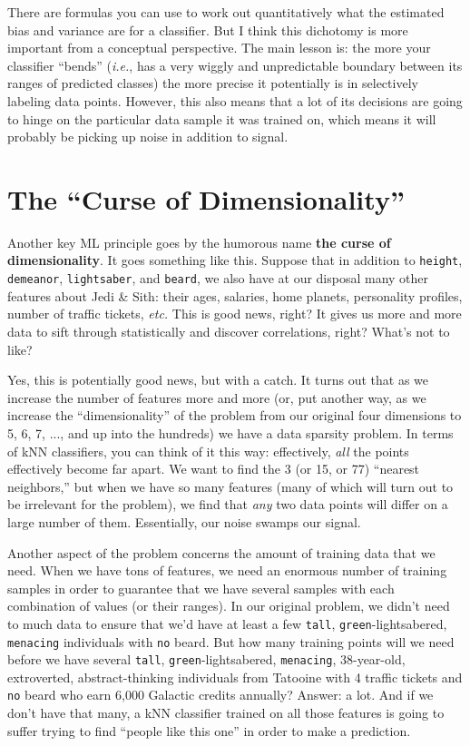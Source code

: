 There are formulas you can use to work out quantitatively what the estimated
bias and variance are for a classifier. But I think this dichotomy is more
important from a conceptual perspective. The main lesson is: the more your
classifier ``bends'' (\textit{i.e.}, has a very wiggly and unpredictable
boundary between its ranges of predicted classes) the more precise it
potentially is in selectively labeling data points. However, this also means
that a lot of its decisions are going to hinge on the particular data sample
it was trained on, which means it will probably be picking up noise in
addition to signal.


\section{The ``Curse of Dimensionality''}

Another key ML principle goes by the humorous name \textbf{the curse of
dimensionality}. It goes something like this. Suppose that in addition to
\texttt{height}, \texttt{demeanor}, \texttt{lightsaber}, and \texttt{beard},
we also have at our disposal many other features about Jedi \& Sith: their
ages, salaries, home planets, personality profiles, number of traffic tickets,
\textit{etc.} This is good news, right? It gives us more and more data to sift
through statistically and discover correlations, right? What's not to like?

Yes, this is potentially good news, but with a catch. It turns out that as we
increase the number of features more and more (or, put another way, as we
increase the ``dimensionality'' of the problem from our original four
dimensions to 5, 6, 7, ..., and up into the hundreds) we have a data sparsity
problem. In terms of kNN classifiers, you can think of it this way:
effectively, \textit{all} the points effectively become far apart. We want to
find the 3 (or 15, or 77) ``nearest neighbors,'' but when we have so many
features (many of which will turn out to be irrelevant for the problem), we
find that \textit{any} two data points will differ on a large number of them.
Essentially, our noise swamps our signal.

Another aspect of the problem concerns the amount of training data that we
need. When we have tons of features, we need an enormous number of training
samples in order to guarantee that we have several samples with each
combination of values (or their ranges). In our original problem, we didn't
need to much data to ensure that we'd have at least a few \texttt{tall},
\texttt{green}-lightsabered, \texttt{menacing} individuals with \texttt{no}
beard. But how many training points will we need before we have several
\texttt{tall}, \texttt{green}-lightsabered, \texttt{menacing}, 38-year-old,
extroverted, abstract-thinking individuals from Tatooine with 4 traffic
tickets and \texttt{no} beard who earn 6,000 Galactic credits annually?
Answer: a lot. And if we don't have that many, a kNN classifier trained on all
those features is going to suffer trying to find ``people like this one'' in
order to make a prediction.


